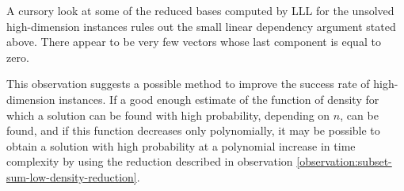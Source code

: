 A cursory look at some of the reduced bases computed by LLL for the
unsolved high-dimension instances rules out the small linear dependency
argument stated above. There appear to be very few vectors whose last
component is equal to zero.

This observation suggests a possible method to improve the success rate of
high-dimension instances. If a good enough estimate of the function of
density for which a solution can be found with high probability, depending
on $n$, can be found, and if this function decreases only polynomially, it
may be possible to obtain a solution with high probability at a polynomial
increase in time complexity by using the reduction described in
observation \ref{observation:subset-sum-low-density-reduction}.

